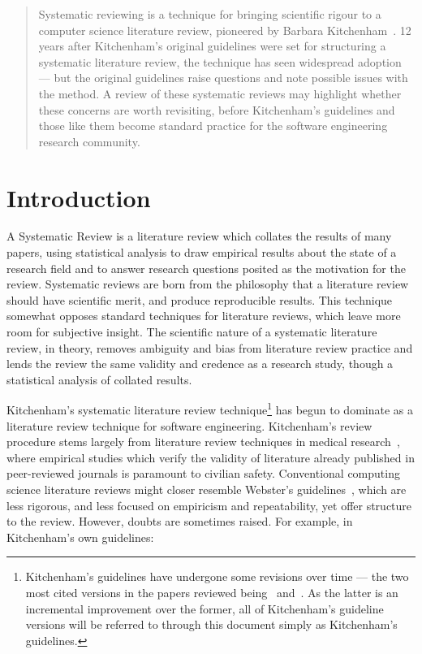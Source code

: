 

\maketitle

\begin{abstract}
Systematic reviewing is a technique for bringing scientific rigour to a computer science literature review, pioneered by Barbara Kitchenham~\citep{Kitchenham2004}. 12 years after Kitchenham's original guidelines were set for structuring a systematic literature review, the technique has seen widespread adoption --- but the original guidelines raise questions and note possible issues with the method. A review of these systematic reviews may highlight whether these concerns are worth revisiting, before Kitchenham's guidelines and those like them become standard practice for the software engineering research community.
\end{abstract}

\section{Introduction}
A Systematic Review is a literature review which collates the results of many papers, using statistical analysis to draw empirical results about the state of a research field and to answer research questions posited as the motivation for the review. Systematic reviews are born from the philosophy that a literature review should have scientific merit, and produce reproducible results. This technique somewhat opposes standard techniques for literature reviews, which leave more room for subjective insight. The scientific nature of a systematic literature review, in theory, removes ambiguity and bias from literature review practice and lends the review the same validity and credence as a research study, though a statistical analysis of collated results.\par

Kitchenham's systematic literature review technique\footnote{Kitchenham's guidelines have undergone some revisions over time --- the two most cited versions in the papers reviewed being~\cite{Kitchenham2004} and~\cite{Kitchenham2007}. As the latter is an incremental improvement over the former, all of Kitchenham's guideline versions will be referred to through this document simply as Kitchenham's guidelines.} has begun to dominate as a literature review technique for software engineering. Kitchenham's review procedure stems largely from literature review techniques in medical research~\citep{Kitchenham2004, khan2001undertaking}, where empirical studies which verify the validity of literature already published in peer-reviewed journals is paramount to civilian safety. Conventional computing science literature reviews might closer resemble Webster's guidelines~\citep{Webster2002}, which are less rigorous, and less focused on empiricism and repeatability, yet offer structure to the review. However, doubts are sometimes raised. For example, in Kitchenham's own guidelines:

